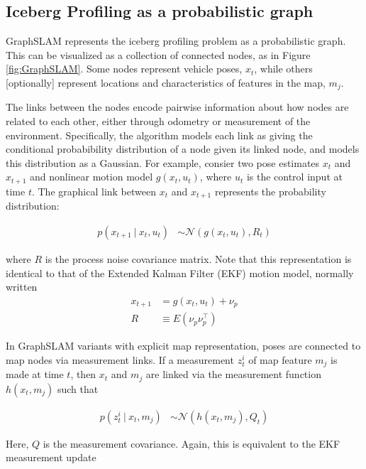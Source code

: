\subsection{Iceberg Profiling as a probabilistic graph}

GraphSLAM represents the iceberg profiling problem as a probabilistic graph. This can be visualized as a collection of connected nodes, as in Figure \ref{fig:GraphSLAM}. Some nodes represent vehicle poses, $x_t$, while others [optionally] represent locations and characteristics of features in the map, $m_j$. 

The links between the nodes encode pairwise information about how nodes are related to each other, either through odometry or measurement of the environment. Specifically, the algorithm models each link as giving the conditional probabibility distribution of a node given its linked node, and models this distribution as a Gaussian. For example, consier two pose estimates $x_t$ and  $x_{t+1}$ and nonlinear motion model $g(x_t,u_t)$, where $u_t$ is the control input at time $t$. The graphical link between $x_t$ and  $x_{t+1}$ represents the probability distribution: 

\begin{align}
p\left(x_{t+1}~|~x_t,u_t\right) & \sim \mathcal{N}\left(g(x_t,u_t), R_t\right)
\label {eq:Gauss1}
\end{align}

where $R$ is the process noise covariance matrix. Note that this representation is identical to that of the Extended Kalman Filter (EKF) motion model, normally written 
\begin{align}
x_{t+1} &= g\left(x_t,u_t\right) + \nu_p\\
R &\equiv E\left(\nu_p \nu_p^\intercal\right) 
\end{align}

In GraphSLAM variants with explicit map representation, poses are connected to map nodes via measurement links. If a measurement $z^i_t$ of map feature $m_j$ is made at time $t$, then $x_t$ and $m_j$ are linked via the measurement function $h \left(x_t,m_j\right)$ such that 

\begin{align}
p\left(z^i_{t}~|~x_t,m_j\right) & \sim \mathcal{N}\left(h(x_t,m_j), Q_t\right)
\label {eq:Gauss2}
\end{align}

Here, $Q$ is the measurement covariance. Again, this is equivalent to the EKF measurement update

